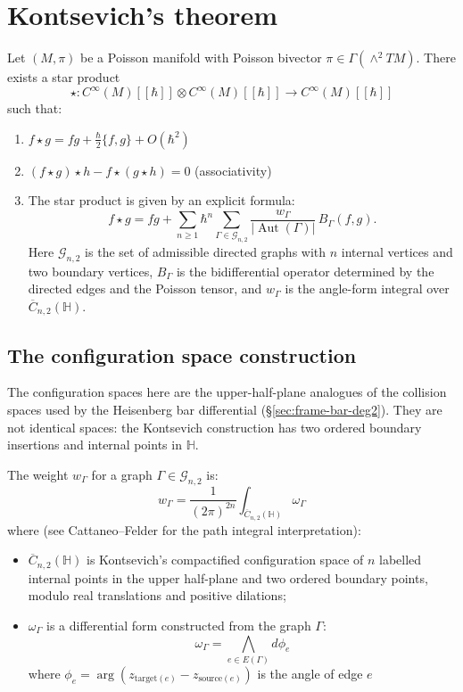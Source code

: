 \section{Kontsevich's theorem}

\begin{theorem}
\label{thm:kontsevich-star-product}
Let $(M,\pi)$ be a Poisson manifold with Poisson bivector
$\pi\in\Gamma(\wedge^2TM)$. There exists a star product
\[
\star\colon C^\infty(M)[[\hbar]]\otimes C^\infty(M)[[\hbar]]
\longrightarrow C^\infty(M)[[\hbar]]
\]
such that:
\begin{enumerate}
\item $f \star g = fg + \frac{\hbar}{2}\{f,g\} + O(\hbar^2)$
\item $(f \star g) \star h - f \star (g \star h) = 0$ (associativity)
\item The star product is given by an explicit formula:
\[
f\star g
=fg+\sum_{n\geq1}\hbar^n
\sum_{\Gamma\in\mathcal G_{n,2}}
\frac{w_\Gamma}{|\operatorname{Aut}(\Gamma)|}\,B_\Gamma(f,g).
\]
Here $\mathcal G_{n,2}$ is the set of admissible directed graphs with
$n$ internal vertices and two boundary vertices, $B_\Gamma$ is the
bidifferential operator determined by the directed edges and the
Poisson tensor, and \(w_\Gamma\) is the angle-form integral over
\(\overline C_{n,2}(\mathbb H)\).
\end{enumerate}
\end{theorem}

\subsection{The configuration space construction}

The configuration spaces here are the upper-half-plane analogues of the
collision spaces used by the Heisenberg bar differential
(\S\ref{sec:frame-bar-deg2}). They are not identical spaces: the
Kontsevich construction has two ordered boundary insertions and
internal points in \(\mathbb H\).

The weight \(w_\Gamma\) for a graph \(\Gamma\in\mathcal G_{n,2}\) is:
\[
w_\Gamma
=\frac{1}{(2\pi)^{2n}}
\int_{\overline C_{n,2}(\mathbb H)}\omega_\Gamma
\]
where (see Cattaneo--Felder \cite{CattaneoFelder99} for the path integral interpretation):
\begin{itemize}
\item $\overline C_{n,2}(\mathbb H)$ is Kontsevich's compactified
configuration space of \(n\) labelled internal points in the upper
half-plane and two ordered boundary points, modulo real translations
and positive dilations;
\item $\omega_\Gamma$ is a differential form constructed from the graph $\Gamma$:
\[\omega_\Gamma = \bigwedge_{e \in E(\Gamma)} d\phi_e\]
where $\phi_e = \arg(z_{\text{target}(e)} - z_{\text{source}(e)})$ is the angle of edge $e$
\end{itemize}


